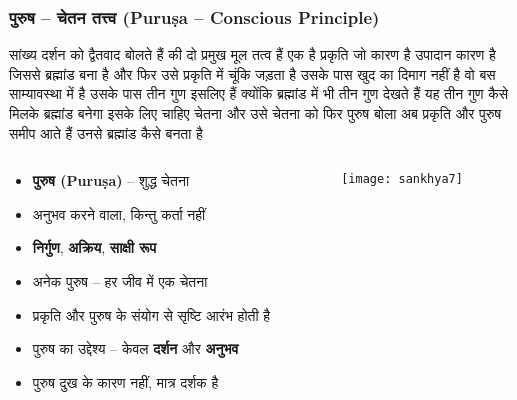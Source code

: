 \begin{frame}[fragile]\frametitle{पुरुष – चेतन तत्त्व (Puruṣa – Conscious Principle)}
सांख्य दर्शन को द्वैतवाद बोलते हैं की दो प्रमुख मूल तत्व हैं एक है प्रकृति जो कारण है उपादान कारण है जिससे ब्रह्मांड बना है और फिर उसे
प्रकृति में चूंकि जड़ता है उसके पास खुद का दिमाग नहीं है वो बस साम्यावस्था में है उसके पास तीन गुण इसलिए हैं क्योंकि ब्रह्मांड में भी तीन गुण देखते हैं यह तीन गुण कैसे मिलके ब्रह्मांड बनेगा इसके लिए चाहिए चेतना और उसे चेतना को फिर पुरुष बोला अब प्रकृति और पुरुष समीप आते हैं उनसे ब्रह्मांड कैसे बनता है

\begin{columns}
    \begin{column}[T]{0.5\linewidth}
      \begin{itemize}
        \item \textbf{पुरुष (Puruṣa)} – शुद्ध चेतना
        \item अनुभव करने वाला, किन्तु कर्ता नहीं
        \item \textbf{निर्गुण}, \textbf{अक्रिय}, \textbf{साक्षी रूप}
        \item अनेक पुरुष – हर जीव में एक चेतना
        \item प्रकृति और पुरुष के संयोग से सृष्टि आरंभ होती है
        \item पुरुष का उद्देश्य – केवल \textbf{दर्शन} और \textbf{अनुभव}
        \item पुरुष दुख के कारण नहीं, मात्र दर्शक है
      \end{itemize}
    \end{column}
    \begin{column}[T]{0.5\linewidth}
      \begin{center}
        \texttt{[image: sankhya7]}
      \end{center}	
    \end{column}
\end{columns}
\end{frame}

